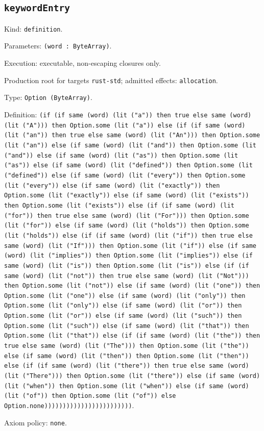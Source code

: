 \documentclass[11pt]{article}
\begin{document}
\subsection*{\texttt{keywordEntry}}
\noindent Kind: \texttt{definition}.\par
\noindent Parameters: \texttt{(word : ByteArray)}.\par
\noindent Execution: executable, non-escaping closures only.\par
\noindent Production root for targets \texttt{rust-std}; admitted effects: \texttt{allocation}.\par
\noindent Type: \texttt{Option (ByteArray)}.\par
\noindent Definition: \texttt{(if (if same (word) (lit ("a")) then true else same (word) (lit ("A"))) then Option.some (lit ("a")) else (if (if same (word) (lit ("an")) then true else same (word) (lit ("An"))) then Option.some (lit ("an")) else (if same (word) (lit ("and")) then Option.some (lit ("and")) else (if same (word) (lit ("as")) then Option.some (lit ("as")) else (if same (word) (lit ("defined")) then Option.some (lit ("defined")) else (if same (word) (lit ("every")) then Option.some (lit ("every")) else (if same (word) (lit ("exactly")) then Option.some (lit ("exactly")) else (if same (word) (lit ("exists")) then Option.some (lit ("exists")) else (if (if same (word) (lit ("for")) then true else same (word) (lit ("For"))) then Option.some (lit ("for")) else (if same (word) (lit ("holds")) then Option.some (lit ("holds")) else (if (if same (word) (lit ("if")) then true else same (word) (lit ("If"))) then Option.some (lit ("if")) else (if same (word) (lit ("implies")) then Option.some (lit ("implies")) else (if same (word) (lit ("is")) then Option.some (lit ("is")) else (if (if same (word) (lit ("not")) then true else same (word) (lit ("Not"))) then Option.some (lit ("not")) else (if same (word) (lit ("one")) then Option.some (lit ("one")) else (if same (word) (lit ("only")) then Option.some (lit ("only")) else (if same (word) (lit ("or")) then Option.some (lit ("or")) else (if same (word) (lit ("such")) then Option.some (lit ("such")) else (if same (word) (lit ("that")) then Option.some (lit ("that")) else (if (if same (word) (lit ("the")) then true else same (word) (lit ("The"))) then Option.some (lit ("the")) else (if same (word) (lit ("then")) then Option.some (lit ("then")) else (if (if same (word) (lit ("there")) then true else same (word) (lit ("There"))) then Option.some (lit ("there")) else (if same (word) (lit ("when")) then Option.some (lit ("when")) else (if same (word) (lit ("of")) then Option.some (lit ("of")) else Option.none))))))))))))))))))))))))}.\par
\noindent Axiom policy: \texttt{none}.\par
\end{document}
